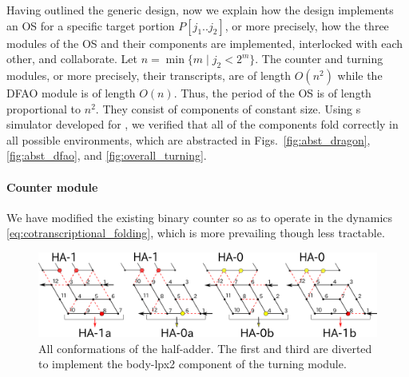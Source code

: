 Having outlined the generic design, now we explain how the design implements an OS for a specific target portion $P[j_1 .. j_2]$, or more precisely, how the three modules of the OS and their components are implemented, interlocked with each other, and collaborate. 
Let $n = \min\{m \mid j_2 < 2^m\}$. 
The counter and turning modules, or more precisely, their transcripts, are of length $O(n^2)$ while the DFAO module is of length $O(n)$. 
Thus, the period of the OS is of length proportional to $n^2$. 
They consist of components of constant size. 
Using s simulator developed for \cite{HaKiOtSe2016}, we verified that all of the components fold correctly in all possible environments, which are abstracted in Figs.~\ref{fig:abst_dragon}, \ref{fig:abst_dfao}, and \ref{fig:overall_turning}. 

			\paragraph{Counter module}
%
We have modified the existing binary counter \cite{GeMeScSe2016} so as to operate in the dynamics \eqref{eq:cotranscriptional_folding}, which is more prevailing \cite{HanKim2017,HaKiOtSe2016,OtaSeki2017} though less tractable. 

\begin{figure}
\vspace*{-5mm}
\centering
\includegraphics[width=\linewidth]{pic/counter_zig.png}
\caption{All conformations of the half-adder.
The first and third are diverted to implement the body-lpx2 component of the turning module. 
}
\label{fig:half-adder}
\vspace*{-3mm}
\end{figure}

